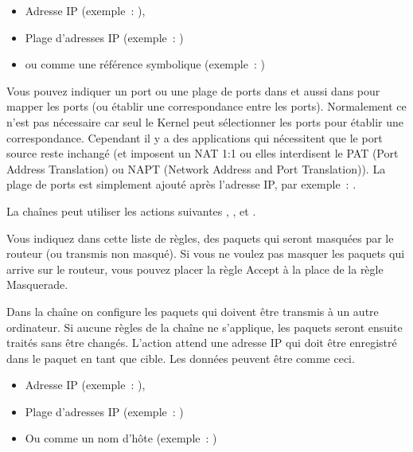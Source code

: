 \begin{itemize}
\item Adresse IP (exemple~: ),
\item Plage d'adresses IP (exemple~: )
\item ou comme une référence symbolique (exemple~: )
\end{itemize}

Vous pouvez indiquer un port ou une plage de ports dans  et aussi
dans  pour mapper les ports (ou établir une correspondance
entre les ports). Normalement ce n'est pas nécessaire car seul le Kernel peut
sélectionner les ports pour établir une correspondance. Cependant il y a des
applications qui nécessitent que le port source reste inchangé (et imposent un
NAT 1:1 ou elles interdisent le PAT (Port Address Translation) ou NAPT
(Network Address and Port Translation)). La plage de ports est simplement ajouté
après l'adresse IP, par exemple~: .

La chaînes  peut utiliser les actions suivantes
, ,  et .

\begin{description}

\mbox{}\newline
Vous indiquez dans cette liste de règles, des paquets qui seront masquées par 
le routeur (ou transmis non masqué). Si vous ne voulez pas masquer les paquets
qui arrive sur le routeur, vous pouvez placer la règle Accept à la place de
la règle Masquerade.

\end{description}

Dans la chaîne  on configure les paquets qui doivent être
transmis à un autre ordinateur. Si aucune règles de la chaîne 
ne s'applique, les paquets seront ensuite traités sans être changés. L'action
 attend une adresse IP qui doit être enregistré dans le paquet
en tant que cible. Les données peuvent être comme ceci.

\begin{itemize}
\item Adresse IP (exemple~: ),
\item Plage d'adresses IP (exemple~: )
\item Ou comme un nom d'hôte (exemple~: )
\end{itemize}

